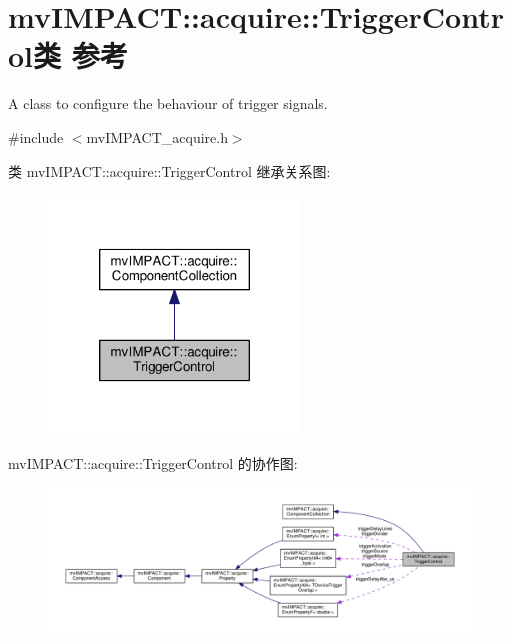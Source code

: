 \hypertarget{classmv_i_m_p_a_c_t_1_1acquire_1_1_trigger_control}{\section{mv\+I\+M\+P\+A\+C\+T\+:\+:acquire\+:\+:Trigger\+Control类 参考}
\label{classmv_i_m_p_a_c_t_1_1acquire_1_1_trigger_control}
}


A class to configure the behaviour of trigger signals.  




{\ttfamily \#include $<$mv\+I\+M\+P\+A\+C\+T\+\_\+acquire.\+h$>$}



类 mv\+I\+M\+P\+A\+C\+T\+:\+:acquire\+:\+:Trigger\+Control 继承关系图\+:
\nopagebreak
\begin{figure}[H]
\begin{center}
\leavevmode
\includegraphics[width=190pt]{classmv_i_m_p_a_c_t_1_1acquire_1_1_trigger_control__inherit__graph}
\end{center}
\end{figure}


mv\+I\+M\+P\+A\+C\+T\+:\+:acquire\+:\+:Trigger\+Control 的协作图\+:
\nopagebreak
\begin{figure}[H]
\begin{center}
\leavevmode
\includegraphics[width=350pt]{classmv_i_m_p_a_c_t_1_1acquire_1_1_trigger_control__coll__graph}
\end{center}
\end{figure}
